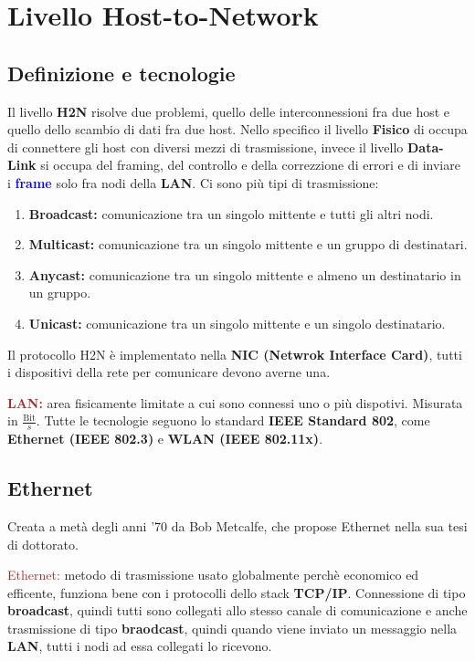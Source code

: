 \chapter{Livello Host-to-Network}
\section{Definizione e tecnologie}
Il livello \textbf{H2N} risolve due problemi, quello delle interconnessioni fra due host e quello dello scambio di dati fra due host. Nello specifico il livello \textbf{Fisico} di occupa di connettere gli host con diversi mezzi di trasmissione, invece il livello \textbf{Data-Link} si occupa del framing, del controllo e della correzzione di errori e di inviare i \textbf{\textcolor{blue}{frame}} solo fra nodi della \textbf{LAN}.
Ci sono più tipi di trasmissione:
\begin{enumerate}
    \item \textbf{Broadcast:} comunicazione tra un singolo mittente e tutti gli altri nodi.
    \item \textbf{Multicast:} comunicazione tra un singolo mittente e un gruppo di destinatari.
    \item \textbf{Anycast:} comunicazione tra un singolo mittente e almeno un destinatario in un gruppo.
    \item \textbf{Unicast:} comunicazione tra un singolo mittente e un singolo destinatario.
\end{enumerate}

Il protocollo H2N è implementato nella \textbf{NIC (Netwrok Interface Card)}, tutti i dispositivi della rete per comunicare devono averne una.

\begin{boxDef}
\textbf{\textcolor{brown}{LAN:}} area fisicamente limitate a cui sono connessi uno o più dispotivi. Misurata in \textbf{$\frac{\text{Bit}}{s}$}. Tutte le tecnologie seguono lo standard \textbf{IEEE Standard 802}, come \textbf{Ethernet (IEEE 802.3)} e \textbf{WLAN (IEEE 802.11x)}.
\end{boxDef}

\section{Ethernet}
Creata a metà degli anni '70 da Bob Metcalfe, che propose Ethernet nella sua tesi di dottorato.

\begin{boxDef}
\textcolor{brown}{Ethernet:} metodo di trasmissione usato globalmente perchè economico ed efficente, funziona bene con i protocolli dello stack \textbf{TCP/IP}.
Connessione di tipo \textbf{broadcast}, quindi tutti sono collegati allo stesso canale di comunicazione e anche trasmissione di tipo \textbf{braodcast}, quindi quando viene inviato un messaggio nella \textbf{LAN}, tutti i nodi ad essa collegati lo ricevono.
\end{boxDef}

